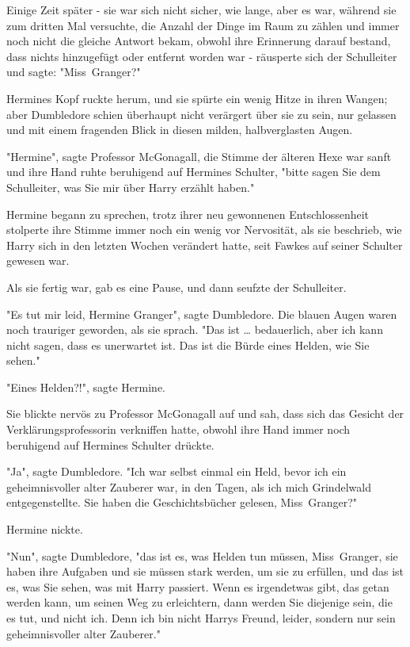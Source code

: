 {Einige Zeit später - sie war sich nicht sicher, wie lange, aber es war, während sie zum dritten Mal versuchte, die Anzahl der Dinge im Raum zu zählen und immer noch nicht die gleiche Antwort bekam, obwohl ihre Erinnerung darauf bestand, dass nichts hinzugefügt oder entfernt worden war - räusperte sich der Schulleiter und sagte: "Miss~Granger?"

Hermines Kopf ruckte herum, und sie spürte ein wenig Hitze in ihren Wangen; aber Dumbledore schien überhaupt nicht verärgert über sie zu sein, nur gelassen und mit einem fragenden Blick in diesen milden, halbverglasten Augen.

"Hermine", sagte Professor McGonagall, die Stimme der älteren Hexe war sanft und ihre Hand ruhte beruhigend auf Hermines Schulter, "bitte sagen Sie dem Schulleiter, was Sie mir über Harry erzählt haben."

Hermine begann zu sprechen, trotz ihrer neu gewonnenen Entschlossenheit stolperte ihre Stimme immer noch ein wenig vor Nervosität, als sie beschrieb, wie Harry sich in den letzten Wochen verändert hatte, seit Fawkes auf seiner Schulter gewesen war.

Als sie fertig war, gab es eine Pause, und dann seufzte der Schulleiter.

"Es tut mir leid, Hermine Granger", sagte Dumbledore. Die blauen Augen waren noch trauriger geworden, als sie sprach. "Das ist … bedauerlich, aber ich kann nicht sagen, dass es unerwartet ist. Das ist die Bürde eines Helden, wie Sie sehen."

"Eines Helden?!", sagte Hermine.

Sie blickte nervös zu Professor McGonagall auf und sah, dass sich das Gesicht der Verklärungsprofessorin verkniffen hatte, obwohl ihre Hand immer noch beruhigend auf Hermines Schulter drückte.

"Ja", sagte Dumbledore. "Ich war selbst einmal ein Held, bevor ich ein geheimnisvoller alter Zauberer war, in den Tagen, als ich mich Grindelwald entgegenstellte. Sie haben die Geschichtsbücher gelesen, Miss~Granger?"

Hermine nickte.

"Nun", sagte Dumbledore, "das ist es, was Helden tun müssen, Miss~Granger, sie haben ihre Aufgaben und sie müssen stark werden, um sie zu erfüllen, und das ist es, was Sie sehen, was mit Harry passiert. Wenn es irgendetwas gibt, das getan werden kann, um seinen Weg zu erleichtern, dann werden Sie diejenige sein, die es tut, und nicht ich. Denn ich bin nicht Harrys Freund, leider, sondern nur sein geheimnisvoller alter Zauberer."

}
